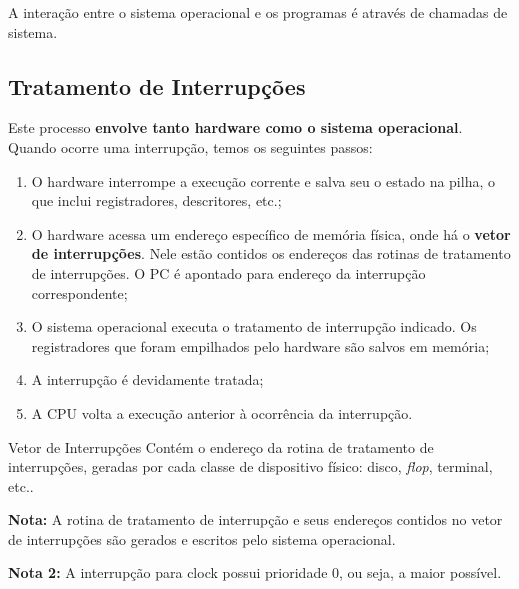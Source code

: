 A interação entre o sistema operacional e os programas é através de chamadas de sistema.



\subsection{Tratamento de Interrupções}

Este processo \textbf{envolve tanto hardware como o sistema operacional}. Quando ocorre uma interrupção, temos os seguintes passos:
\begin{enumerate}
  \item O hardware interrompe a execução corrente e salva seu o estado na pilha, o que inclui registradores, descritores, etc.;

  \item O hardware acessa um endereço específico de memória física, onde há o \textbf{vetor de interrupções}. Nele estão contidos os endereços das rotinas de tratamento de interrupções. O PC é apontado para endereço da interrupção correspondente;

  \item O sistema operacional executa o tratamento de interrupção indicado. Os registradores que foram empilhados pelo hardware são salvos em memória;

  \item A interrupção é devidamente tratada;

  \item A CPU volta a execução anterior à ocorrência da interrupção.
\end{enumerate}

\begin{definicao}{Vetor de Interrupções}
  Contém o endereço da rotina de tratamento de interrupções, geradas por cada classe de dispositivo físico: disco, \textit{flop}, terminal, etc..
\end{definicao}

\textbf{Nota:} A rotina de tratamento de interrupção e seus endereços contidos no vetor de interrupções são gerados e escritos pelo sistema operacional.

\textbf{Nota 2:} A interrupção para clock possui prioridade 0, ou seja, a maior possível.



















